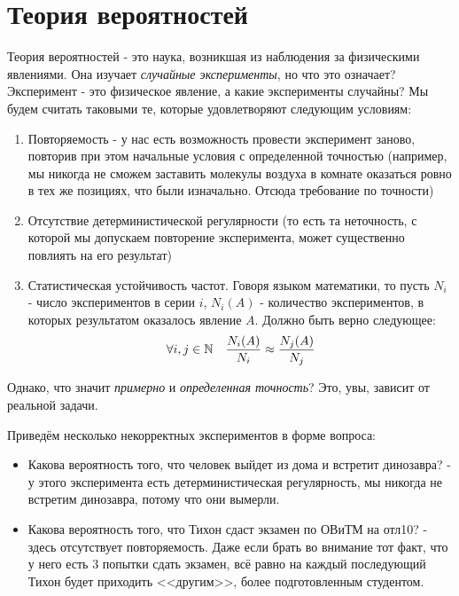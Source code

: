 \section{Теория вероятностей}

\begin{note}
	Теория вероятностей - это наука, возникшая из наблюдения за физическими явлениями. Она изучает \textit{случайные эксперименты}, но что это означает? Эксперимент - это физическое явление, а какие эксперименты случайны? Мы будем считать таковыми те, которые удовлетворяют следующим условиям:
	\begin{enumerate}
		\item Повторяемость - у нас есть возможность провести эксперимент заново, повторив при этом начальные условия с определенной точностью (например, мы никогда не сможем заставить молекулы воздуха в комнате оказаться ровно в тех же позициях, что были изначально. Отсюда требование по точности) 
		
		\item Отсутствие детерминистической регулярности (то есть та неточность, с которой мы допускаем повторение эксперимента, может существенно повлиять на его результат)
		
		\item Статистическая устойчивость частот. Говоря языком математики, то пусть $N_i$ - число экспериментов в серии $i$, $N_i(A)$ - количество экспериментов, в которых результатом оказалось явление $A$. Должно быть верно следующее:
		\[
			\forall i, j \in \mathbb{N} \quad \frac{N_i(A)}{N_i} \approx \frac{N_j(A)}{N_j} 
		\]
	\end{enumerate}
	Однако, что значит \textit{примерно} и \textit{определенная точность}? Это, увы, зависит от реальной задачи.
\end{note}

\begin{example}
	Приведём несколько некорректных экспериментов в форме вопроса:
	\begin{itemize}
		\item Какова вероятность того, что человек выйдет из дома и встретит динозавра? - у этого эксперимента есть детерминистическая регулярность, мы никогда не встретим динозавра, потому что они вымерли.
		
		\item Какова вероятность того, что Тихон сдаст экзамен по ОВиТМ на отл10? - здесь отсутствует повторяемость. Даже если брать во внимание тот факт, что у него есть 3 попытки сдать экзамен, всё равно на каждый последующий Тихон будет приходить <<другим>>, более подготовленным студентом.
	\end{itemize}
\end{example}

